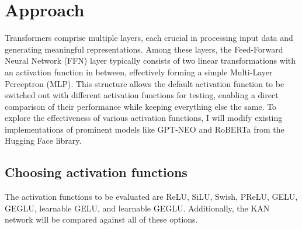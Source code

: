 \section{Approach} %




Transformers comprise multiple layers, each crucial in processing input data and generating meaningful representations. Among these layers, the Feed-Forward Neural Network (FFN) layer typically consists of two linear transformations with an activation function in between, effectively forming a simple Multi-Layer Perceptron (MLP). This structure allows the default activation function to be switched out with different activation functions for testing, enabling a direct comparison of their performance while keeping everything else the same. To explore the effectiveness of various activation functions, I will modify existing implementations of prominent models like GPT-NEO and RoBERTa from the Hugging Face library.

\subsection{Choosing activation functions}
The activation functions to be evaluated are ReLU, SiLU, Swish, PReLU, GELU, GEGLU, learnable GELU, and learnable GEGLU. Additionally, the KAN network will be compared against all of these options.

